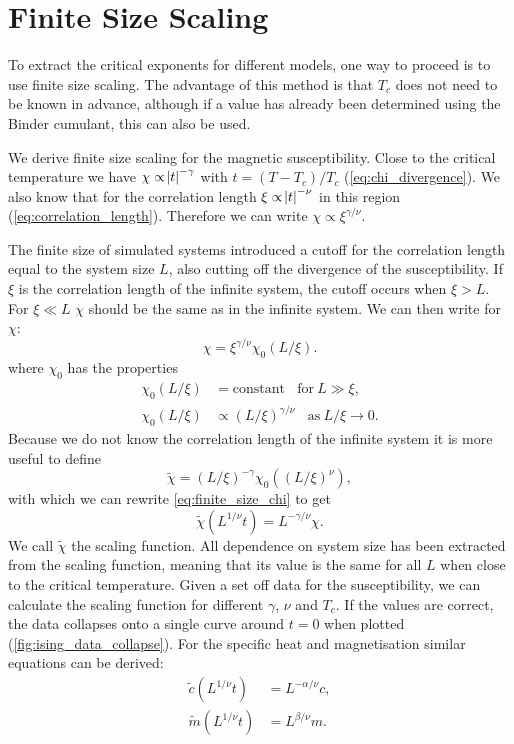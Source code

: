 \documentclass[11pt, a4paper]{report} %
\begin{document}
\section{Finite Size Scaling}
To extract the critical exponents for different models, one way to proceed is to use finite size scaling.
The advantage of this method is that \(T_c\) does not need to be known in advance, although if a value has already been determined using the Binder cumulant, this can also be used.

We derive finite size scaling for the magnetic susceptibility.
Close to the critical temperature we have \(\chi \propto \abs{t} ^{-\gamma}\) with \(t = (T-T_c) / T_c\) (\cref{eq:chi_divergence}).
We also know that for the correlation length \(\xi \propto \abs{t}^{-\nu}\) in this region (\cref{eq:correlation_length}).
Therefore we can write \(\chi \propto \xi^{\gamma /\nu}\).

The finite size of simulated systems introduced a cutoff for the correlation length equal to the system size \(L\), also cutting off the divergence of the susceptibility.
If \(\xi\) is the correlation length of the infinite system, the cutoff occurs when \(\xi > L\).
For \(\xi \ll L\) \(\chi\) should be the same as in the infinite system.
We can then write for \(\chi\):
\begin{equation}\label{eq:finite_size_chi}
	\chi = \xi^{\gamma/\nu} \chi_0(L/\xi).
\end{equation}
where \(\chi_0\) has the properties
\begin{align}
	\chi_0(L/\xi) &= \mathrm{constant}\ \ \ \ \mathrm{for}\ L \gg \xi,\\
	\chi_0(L/\xi) &\propto (L/\xi)^{\gamma/\nu}\ \ \ \ \mathrm{as}\ L/\xi \to 0.
\end{align}
Because we do not know the correlation length of the infinite system it is more useful to define
\begin{equation}
	\tilde{\chi} = (L/\xi)^{-\gamma} \chi_0((L/\xi)^{\nu}),
\end{equation}
with which we can rewrite \cref{eq:finite_size_chi} to get
\begin{equation}
	\tilde{\chi}(L^{1/\nu}t) = L^{-\gamma/\nu}\chi.
\end{equation}
We call \(\tilde{\chi}\) the scaling function.
All dependence on system size has been extracted from the scaling function, meaning that its value is the same for all \(L\) when close to the critical temperature.
Given a set off data for the susceptibility, we can calculate the scaling function for different \(\gamma\), \(\nu\) and \(T_c\).
If the values are correct, the data collapses onto a single curve around \(t=0\) when plotted (\cref{fig:ising_data_collapse}).
For the specific heat and magnetisation similar equations can be derived\cite{newman:1999}:
\begin{align}
	\widetilde{c}(L^{1/\nu}t) &= L^{-\alpha/\nu} c, \\
	\widetilde{m}(L^{1/\nu}t) &= L^{\beta/\nu} m.
\end{align}
\end{document}
